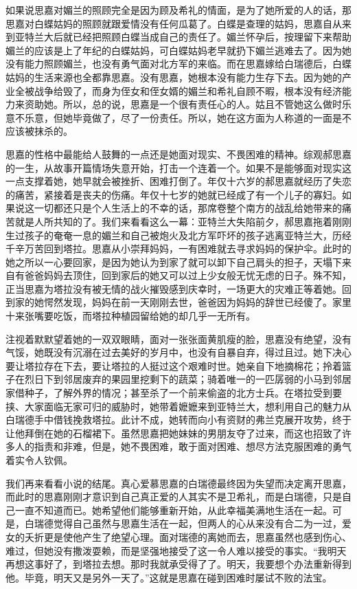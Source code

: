 \par 如果说思嘉对媚兰的照顾完全是因为顾及希礼的情面，是为了她所爱的人的话，那思嘉对白蝶姑妈的照顾就跟爱情没有任何瓜葛了。白蝶是查理的姑妈，思嘉自从来到亚特兰大后就已经把照顾白蝶当成自己的责任了。媚兰怀孕后，按理留下来帮助媚兰的应该是上了年纪的白蝶姑妈，可白蝶姑妈老早就扔下媚兰逃难去了。因为她没有能力照顾媚兰，也没有勇气面对北方军的来临。而在思嘉嫁给白瑞德后，白蝶姑妈的生活来源也全都靠思嘉。没有思嘉，她根本没有能力生存下去。因为她的产业全被战争给毁了，而身为侄女和侄女婿的媚兰和希礼自顾不暇，根本没有经济能力来资助她。所以，总的说，思嘉是一个很有责任心的人。姑且不管她这么做时乐意不乐意，但她毕竟做了，尽了一份责任。所以，她在这方面为人称道的一面是不应该被抹杀的。
\par 思嘉的性格中最能给人鼓舞的一点还是她面对现实、不畏困难的精神。综观郝思嘉的一生，从故事开篇情场失意开始，打击一个连着一个。如果不是能够面对现实这一点支撑着她，她早就会被挫折、困难打倒了。年仅十六岁的郝思嘉就经历了失恋的痛苦，紧接着是丧夫的伤痛。年仅十七岁的她就已经成了有一个儿子的寡妇。如果说这一切都还只是个人生活上的不幸的话，那席卷整个南方的战乱给她带来的痛苦就是人所共知的了。我们来看看这么一幕：亚特兰大失陷前夕，郝思嘉拖着刚刚生过孩子的奄奄一息的媚兰和自己被炮火及北方军吓坏的孩子逃离亚特兰大，历经千辛万苦回到塔拉。思嘉从小崇拜妈妈，一有困难就去寻求妈妈的保护伞。此时的她之所以一心要回家，是因为她认为到家了就可以卸下自己肩头的担子，天塌下来自有爸爸妈妈去顶住，回到家后的她又可以过上少女般无忧无虑的日子。殊不知，正当思嘉为塔拉没有被无情的战火摧毁感到庆幸时，一场更大的灾难正等着她。回到家的她愕然发现，妈妈在前一天刚刚去世，爸爸因为妈妈的辞世已经傻了。家里十来张嘴要吃饭，而塔拉种植园留给她的却几乎一无所有。
\par 注视着默默望着她的一双双眼睛，面对一张张面黄肌瘦的脸，思嘉没有绝望，没有气馁，她既没有沉溺在过去美好的岁月中，也没有自暴自弃，得过且过。她下决心要让塔拉存在下去，要让塔拉的人挺过这个艰难时世。她亲自下地摘棉花；拎着篮子在烈日下到邻居废弃的果园里挖剩下的蔬菜；骑着唯一的一匹孱弱的小马到邻居家借种子，了解外界的情况；甚至杀了一个前来偷盗的北方士兵。在塔拉受到要挟、大家面临无家可归的威胁时，她带着嬷嬷来到亚特兰大，想利用自己的魅力从白瑞德手中借钱挽救塔拉。此计不成，她转而向小有资财的弗兰克展开攻势，终于让他拜倒在她的石榴裙下。虽然思嘉把她妹妹的男朋友夺了过来，而这也招致了许多人的指责和非难，但是，她不畏困难，敢于面对困难、想尽方法克服困难的勇气着实令人钦佩。
\par 我们再来看看小说的结尾。真心爱慕思嘉的白瑞德最终因为失望而决定离开思嘉，而此时的思嘉刚刚才意识到自己真正爱的人其实不是卫希礼，而是白瑞德，只是自己一直不知道而已。她希望他们能够重新开始，从此幸福美满地生活在一起。可是，白瑞德觉得自己虽然与思嘉生活在一起，但两人的心从来没有合二为一过，爱女的夭折更是使他产生了绝望心理。面对瑞德的离她而去，思嘉虽然也感到伤心、难过，但她没有撒泼耍赖，而是坚强地接受了这一令人难以接受的事实。“我明天再想这事好了，到塔拉去想。那时我就承受得了了。明天，我要想个办法重新得到他。毕竟，明天又是另外一天了。”这就是思嘉在碰到困难时屡试不败的法宝。

